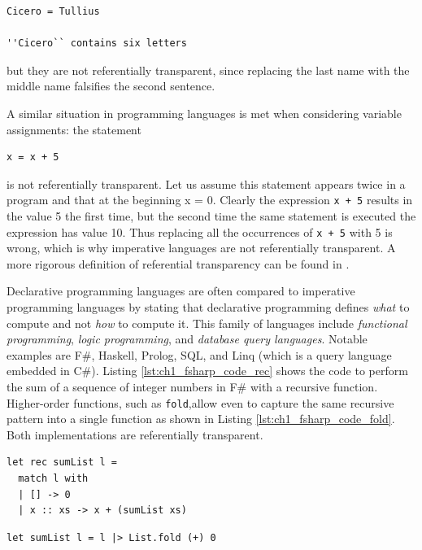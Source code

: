 \begin{lstlisting}
Cicero = Tullius

''Cicero`` contains six letters
\end{lstlisting} 

\noindent
but they are not referentially transparent, since replacing the last name with the middle name falsifies the second sentence.

A similar situation in programming languages is met when considering variable assignments: the statement

\begin{lstlisting}
x = x + 5
\end{lstlisting}

\noindent
is not referentially transparent. Let us assume this statement appears twice in a program and that at the beginning x = 0. Clearly the expression \texttt{x + 5} results in the value 5 the first time, but the second time the same statement is executed the expression has value 10. Thus replacing all the occurrences of \texttt{x + 5} with 5 is wrong, which is why imperative languages are not referentially transparent. A more rigorous definition of referential transparency can be found in \cite{sondergaard1990referential}.

Declarative programming languages are often compared to imperative programming languages by stating that declarative programming defines \textit{what} to compute and not \textit{how} to compute it. This family of languages include \textit{functional programming}, \textit{logic programming}, and \textit{database query languages}. Notable examples are F\#, Haskell, Prolog, SQL, and Linq (which is a query language embedded in C\#). Listing \ref{lst:ch1_fsharp_code_rec} shows the code to perform the sum of a sequence of integer numbers in F\# with a recursive function. Higher-order functions, such as \texttt{fold},allow even to capture the same recursive pattern into a single function as shown in Listing \ref{lst:ch1_fsharp_code_fold}. Both implementations are referentially transparent.

\begin{lstlisting}[caption = Recursive F\# code to compute the sum of a sequence of numbers, label = lst:ch1_fsharp_code_rec]
let rec sumList l =
  match l with
  | [] -> 0
  | x :: xs -> x + (sumList xs)
\end{lstlisting}

\begin{lstlisting}[caption = F\# code to compute the sum of a sequence of numbers using higher-order functions, label = lst:ch1_fsharp_code_fold]
let sumList l = l |> List.fold (+) 0
\end{lstlisting}

